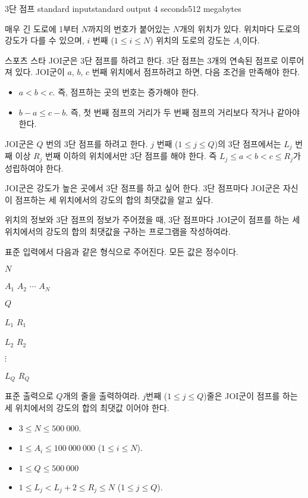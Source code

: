 \begin{problem}{3단 점프}
	{standard input}{standard output}
	{4 seconds}{512 megabytes}{}
	
	매우 긴 도로에 1부터 $N$까지의 번호가 붙어있는 $N$개의 위치가 있다. 위치마다 도로의 강도가 다를 수 있으며, $i$ 번째 ($1 \le i \le N$) 위치의 도로의 강도는 $A_i$이다.
	
	스포츠 스타 JOI군은 3단 점프를 하려고 한다. 3단 점프는 3개의 연속된 점프로 이루어져 있다. JOI군이 $a$, $b$, $c$ 번째 위치에서 점프하려고 하면, 다음 조건을 만족해야 한다.
	
	\begin{itemize}
		\item $a<b<c$. 즉, 점프하는 곳의 번호는 증가해야 한다.
		\item $b-a \le c-b$. 즉, 첫 번째 점프의 거리가 두 번째 점프의 거리보다 작거나 같아야 한다.
	\end{itemize}

	JOI군은 $Q$ 번의 3단 점프를 하려고 한다. $j$ 번째 ($1 \le j \le Q$)의 3단 점프에서는 $L_j$ 번째 이상 $R_j$ 번째 이하의 위치에서만 3단 점프를 해야 한다. 즉 $L_j \le a < b < c \le R_j$가 성립하여야 한다.
	
	JOI군은 강도가 높은 곳에서 3단 점프를 하고 싶어 한다. 3단 점프마다 JOI군은 자신이 점프하는 세 위치에서의 강도의 합의 최댓값을 알고 싶다.
	
	위치의 정보와 3단 점프의 정보가 주어졌을 때, 3단 점프마다 JOI군이 점프를 하는 세 위치에서의 강도의 합의 최댓값을 구하는 프로그램을 작성하여라.
	
	
	\InputFile
	
	표준 입력에서 다음과 같은 형식으로 주어진다. 모든 값은 정수이다.

	$N$
	
	$A_1$ $A_2$ $\cdots$ $A_N$
	
	$Q$
	
	$L_1$ $R_1$
	
	$L_2$ $R_2$
	
	$\vdots$
	
	$L_Q$ $R_Q$
	
	\OutputFile
	
	표준 출력으로 $Q$개의 줄을 출력하여라. $j$번째 ($1 \le j \le Q$)줄은 JOI군이 점프를 하는 세 위치에서의 강도의 합의 최댓값 이어야 한다.
	
	\Constraints
	
	\begin{itemize}
	
	\item $3 \le N \le 500\ 000$.
	\item $1 \le A_i \le 100\ 000\ 000$ ($1 \le i \le N$).
	\item $1 \le Q \le 500\ 000$
	\item $1 \le L_j < L_j + 2 \le R_j \le N$ ($1 \le j \le Q$).
		

\end{itemize}
\end{problem}
